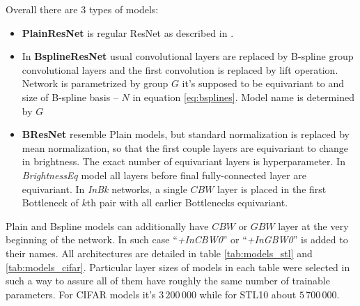 Overall there are 3 types of models:
\begin{itemize}
    \item \textbf{PlainResNet} is regular ResNet as described in \cite{resnet}.
    \item In \textbf{BsplineResNet} usual convolutional layers are replaced by
        B-spline group convolutional layers and the first convolution is replaced
        by lift operation. Network is parametrized by group $G$ it's supposed to be
        equivariant to and size of B-spline basis -- $N$ in equation
        \ref{eq:bsplines}. Model name is determined by $G$
    \item \textbf{BResNet} resemble Plain models, but standard normalization is
        replaced by mean normalization, so that the first couple layers are
        equivariant to change in brightness. The exact number of equivariant
        layers is hyperparameter. In \textit{BrightnessEq} model all layers before
        final fully-connected layer are equivariant. In \textit{InBk} networks,
        a single $\mathit{CBW}$ layer is placed in the first Bottleneck of $k$th pair
        with all earlier Bottlenecks equivariant.
\end{itemize}
Plain and Bspline models can additionally have $\mathit{CBW}$ or $\mathit{GBW}$
layer at the very beginning of the network. In such case ``\textit{+InCBW0}'' or
``\textit{+InGBW0}'' is added to their names. All architectures are detailed in
table \ref{tab:models_stl} and \ref{tab:models_cifar}. Particular layer sizes of
models in each table were selected in such a way to assure all of them have
roughly the same number of trainable parameters. For CIFAR models it's
$3\,200\,000$ while for STL10 about $5\,700\,000$.

